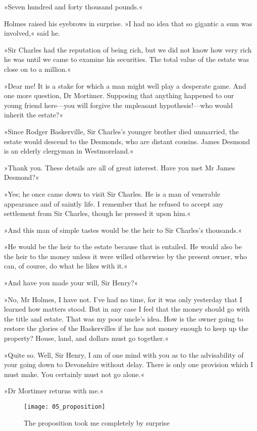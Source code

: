 »Seven hundred and forty thousand pounds.«


Holmes raised his eyebrows in surprise. »I had no idea that so gigantic a sum was involved,« said he.

»Sir Charles had the reputation of being rich, but we did not know how very rich he was until we came to examine his securities. The total value of the estate was close on to a million.«

»Dear me! It is a stake for which a man might well play a desperate game. And one more question, Dr Mortimer. Supposing that anything happened to our young friend here—you will forgive the unpleasant hypothesis!—who would inherit the estate?«

»Since Rodger Baskerville, Sir Charles's younger brother died unmarried, the estate would descend to the Desmonds, who are distant cousins. James Desmond is an elderly clergyman in Westmoreland.«

»Thank you. These details are all of great interest. Have you met Mr James Desmond?«

»Yes; he once came down to visit Sir Charles. He is a man of venerable appearance and of saintly life. I remember that he refused to accept any settlement from Sir Charles, though he pressed it upon him.«

»And this man of simple tastes would be the heir to Sir Charles's thousands.«

»He would be the heir to the estate because that is entailed. He would also be the heir to the money unless it were willed otherwise by the present owner, who can, of course, do what he likes with it.«

»And have you made your will, Sir Henry?«

»No, Mr Holmes, I have not. I've had no time, for it was only yesterday that I learned how matters stood. But in any case I feel that the money should go with the title and estate. That was my poor uncle's idea. How is the owner going to restore the glories of the Baskervilles if he has not money enough to keep up the property? House, land, and dollars must go together.«

»Quite so. Well, Sir Henry, I am of one mind with you as to the advisability of your going down to Devonshire without delay. There is only one provision which I must make. You certainly must not go alone.«

»Dr Mortimer returns with me.«


\begin{figure}[t!h]
\centering
\texttt{[image: 05\_proposition]}
\caption{The proposition took me completely by surprise}
\end{figure}

